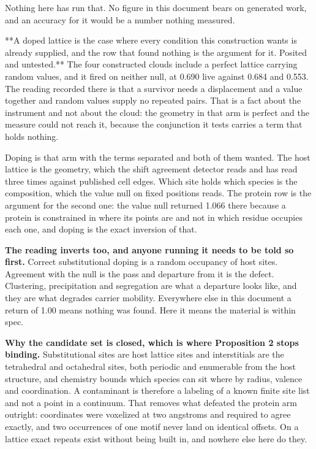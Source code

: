 Nothing here has run that. No figure in this document bears on generated work, and an accuracy for it would be a number nothing measured.

**A doped lattice is the case where every condition this construction wants is already supplied, and the row that found nothing is the argument for it. Posited and untested.** The four constructed clouds include a perfect lattice carrying random values, and it fired on neither null, at 0.690 live against 0.684 and 0.553. The reading recorded there is that a survivor needs a displacement and a value together and random values supply no repeated pairs. That is a fact about the instrument and not about the cloud: the geometry in that arm is perfect and the measure could not reach it, because the conjunction it tests carries a term that holds nothing.

Doping is that arm with the terms separated and both of them wanted. The host lattice is the geometry, which the shift agreement detector reads and has read three times against published cell edges. Which site holds which species is the composition, which the value null on fixed positions reads. The protein row is the argument for the second one: the value null returned 1.066 there because a protein is constrained in where its points are and not in which residue occupies each one, and doping is the exact inversion of that.

\textbf{The reading inverts too, and anyone running it needs to be told so first.} Correct substitutional doping is a random occupancy of host sites. Agreement with the null is the pass and departure from it is the defect. Clustering, precipitation and segregation are what a departure looks like, and they are what degrades carrier mobility. Everywhere else in this document a return of 1.00 means nothing was found. Here it means the material is within spec.

\textbf{Why the candidate set is closed, which is where Proposition 2 stops binding.} Substitutional sites are host lattice sites and interstitials are the tetrahedral and octahedral sites, both periodic and enumerable from the host structure, and chemistry bounds which species can sit where by radius, valence and coordination. A contaminant is therefore a labeling of a known finite site list and not a point in a continuum. That removes what defeated the protein arm outright: coordinates were voxelized at two angstroms and required to agree exactly, and two occurrences of one motif never land on identical offsets. On a lattice exact repeats exist without being built in, and nowhere else here do they.

